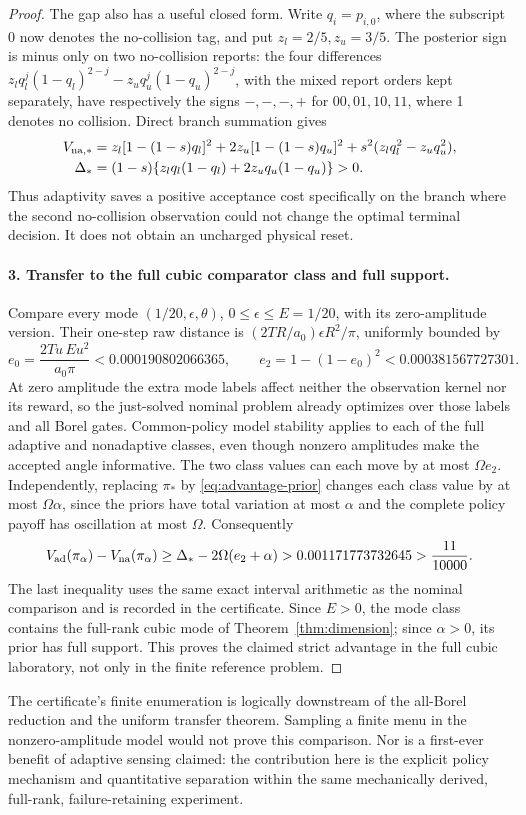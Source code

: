 \begin{proof}
The gap also has a useful closed form. Write $q_i=p_{i,0}$, where the
subscript $0$ now denotes the no-collision tag, and put
$z_l=2/5,z_u=3/5$. The posterior sign is minus only on two no-collision
reports: the four differences
$z_l q_l^j(1-q_l)^{2-j}-z_u q_u^j(1-q_u)^{2-j}$, with the mixed report
orders kept separately, have respectively the signs $-, -, -, +$ for
$00,01,10,11$, where 1 denotes no collision. Direct branch summation gives
\begin{align}
 V_{\rm na,*}
 &=z_l[1-(1-s)q_l]^2+2z_u[1-(1-s)q_u]^2
                  +s^2(z_lq_l^2-z_uq_u^2),\notag\\
 \Delta_*&=(1-s)\{z_lq_l(1-q_l)+2z_uq_u(1-q_u)\}>0.
 \label{eq:adaptive-closed-gap}
\end{align}
Thus adaptivity saves a positive acceptance cost specifically on the branch
where the second no-collision observation could not change the optimal
terminal decision. It does not obtain an uncharged physical reset.

\paragraph{3. Transfer to the full cubic comparator class and full support.}
Compare every mode $(1/20,\epsilon,\theta)$, $0\le\epsilon\le E=1/20$,
with its zero-amplitude version. Their one-step raw distance is
$(2TR/a_0)\epsilon R^2/\pi$, uniformly bounded by
\[
 e_0=\frac{2Tu\,Eu^2}{a_0\pi}
       <0.000190802066365,
 \qquad e_2=1-(1-e_0)^2<0.000381567727301.
\]
At zero amplitude the extra mode labels affect neither the observation
kernel nor its reward, so the just-solved nominal problem already optimizes
over those labels and all Borel gates. Common-policy model stability applies
to each of the full adaptive and nonadaptive classes, even though nonzero
amplitudes make the accepted angle informative. The two class values can
each move by at most $\Omega e_2$. Independently, replacing $\pi_*$ by
\eqref{eq:advantage-prior} changes each class value by at most $\Omega\alpha$,
since the priors have total variation at most $\alpha$ and the complete
policy payoff has oscillation at most $\Omega$. Consequently
\[
 V_{\rm ad}(\pi_\alpha)-V_{\rm na}(\pi_\alpha)
 \ge\Delta_*-2\Omega(e_2+\alpha)
 >0.001171773732645>\frac{11}{10000}.
\]
The last inequality uses the same exact interval arithmetic as the nominal
comparison and is recorded in the certificate. Since $E>0$, the mode class
contains the full-rank cubic mode of Theorem~\ref{thm:dimension}; since
$\alpha>0$, its prior has full support. This proves the claimed strict
advantage in the full cubic laboratory, not only in the finite reference
problem.
\end{proof}

The certificate's finite enumeration is logically downstream of the
all-Borel reduction and the uniform transfer theorem. Sampling a finite
menu in the nonzero-amplitude model would not prove this comparison.
Nor is a first-ever benefit of adaptive sensing claimed: the contribution
here is the explicit policy mechanism and quantitative separation within
the same mechanically derived, full-rank, failure-retaining experiment.
